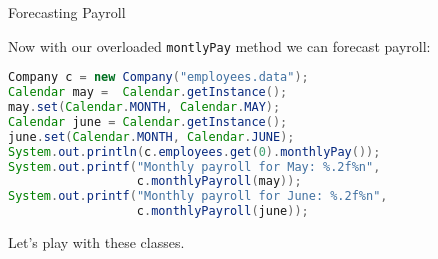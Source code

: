\documentclass{beamer}
\begin{document}
\begin{frame}[fragile]{Forecasting Payroll}


Now with our overloaded  {\tt montlyPay} method we can forecast payroll:
\begin{lstlisting}[language=Java]
Company c = new Company("employees.data");
Calendar may =  Calendar.getInstance();
may.set(Calendar.MONTH, Calendar.MAY);
Calendar june = Calendar.getInstance();
june.set(Calendar.MONTH, Calendar.JUNE);
System.out.println(c.employees.get(0).monthlyPay());
System.out.printf("Monthly payroll for May: %.2f%n",
                  c.monthlyPayroll(may));
System.out.printf("Monthly payroll for June: %.2f%n",
                  c.monthlyPayroll(june));
\end{lstlisting}

Let's play with these classes.


\end{frame}









\end{document}
